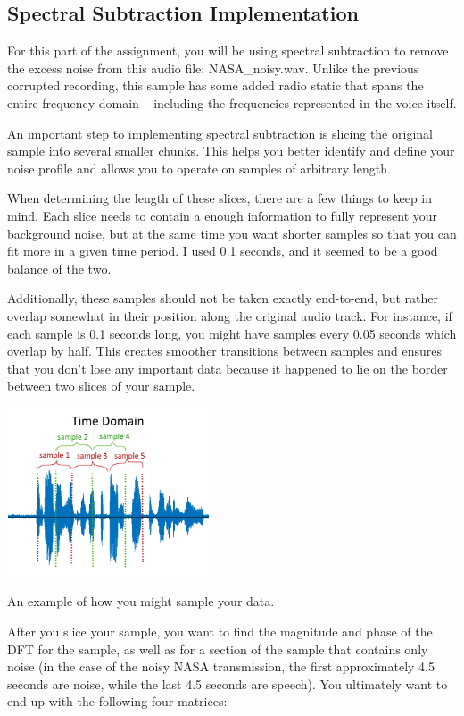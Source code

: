 \documentclass{tufte-handout}
\begin{document}
\subsection{Spectral Subtraction Implementation}
For this part of the assignment, you will be using spectral subtraction to remove the excess noise from this audio file: NASA_noisy.wav. Unlike the previous corrupted recording, this sample has some added radio static that spans the entire frequency domain – including the frequencies represented in the voice itself.

An important step to implementing spectral subtraction is slicing the original sample into several smaller chunks. This helps you better identify and define your noise profile and allows you to operate on samples of arbitrary length.

When determining the length of these slices, there are a few things to keep in mind. Each slice needs to contain a enough information to fully represent your background noise, but at the same time you want shorter samples so that you can fit more in a given time period. I used 0.1 seconds, and it seemed to be a good balance of the two.

Additionally, these samples should not be taken exactly end-to-end, but rather overlap somewhat in their position along the original audio track. For instance, if each sample is 0.1 seconds long, you might have samples every 0.05 seconds which overlap by half. This creates smoother transitions between samples and ensures that you don't lose any important data because it happened to lie on the border between two slices of your sample.

\begin{marginfigure}
    \centering
    \includegraphics[width = 6cm, height = 5cm]{sample_1.png}
    \label{fig:sample_data_1}
\caption{An example of how you might sample your data.}
\end{marginfigure}

After you slice your sample, you want to find the magnitude and phase of the DFT for the sample, as well as for a section of the sample that contains only noise (in the case of the noisy NASA transmission, the first approximately 4.5 seconds are noise, while the last 4.5 seconds are speech). You ultimately want to end up with the following four matrices:
\end{document}
